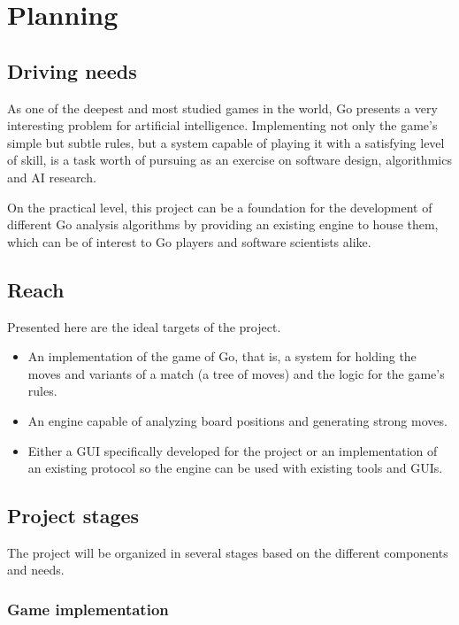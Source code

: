 \section{Planning}

\subsection{Driving needs}

As one of the deepest and most studied games in the world, Go presents a very
interesting problem for artificial intelligence. Implementing not only the
game's simple but subtle rules, but a system capable of playing it with a
satisfying level of skill, is a task worth of pursuing as an exercise on
software design, algorithmics and AI research.

On the practical level, this project can be a foundation for the development of
different Go analysis algorithms by providing an existing engine to house them,
which can be of interest to Go players and software scientists alike.

\subsection{Reach}

Presented here are the ideal targets of the project.

\begin{itemize}
	\item An implementation of the game of Go, that is, a system for holding the
		moves and variants of a match (a tree of moves) and the logic for the
		game's rules.
	\item An engine capable of analyzing board positions and generating strong
		moves.
	\item Either a GUI specifically developed for the project or an
		implementation of an existing protocol so the engine can be used with
		existing tools and GUIs.
\end{itemize}

\subsection{Project stages}

The project will be organized in several stages based on the different
components and needs.

\subsubsection{Game implementation}

